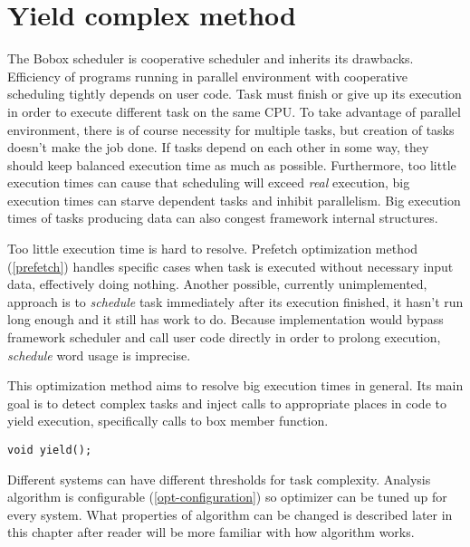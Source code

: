 \chapter{Yield complex method}
\label{yield-intro}
The Bobox scheduler is cooperative scheduler and inherits its drawbacks. Efficiency of programs running in parallel environment with cooperative scheduling tightly depends on user code. Task must finish or give up its execution in order to execute different task on the same CPU. To take advantage of parallel environment, there is of course necessity for multiple tasks, but creation of tasks doesn't make the job done. If tasks depend on each other in some way, they should keep balanced execution time as much as possible. Furthermore, too little execution times can cause that scheduling will exceed \textit{real} execution, big execution times can starve dependent tasks and inhibit parallelism. Big execution times of tasks producing data can also congest framework internal structures.

Too little execution time is hard to resolve. Prefetch optimization method (\ref{prefetch}) handles specific cases when task is executed without necessary input data, effectively doing nothing. Another possible, currently unimplemented, approach is to \textit{schedule} task immediately after its execution finished, it hasn't run long enough and it still has work to do. Because implementation would bypass framework scheduler and call user code directly in order to prolong execution, \textit{schedule} word usage is imprecise.

This optimization method aims to resolve big execution times in general. Its main goal is to detect complex tasks and inject calls to appropriate places in code to yield execution, specifically calls to box member function.

\begin{lstlisting}
void yield();
\end{lstlisting}

Different systems can have different thresholds for task complexity. Analysis algorithm is configurable (\ref{opt-configuration}) so optimizer can be tuned up for every system. What properties of algorithm can be changed is described later in this chapter after reader will be more familiar with how algorithm works.

